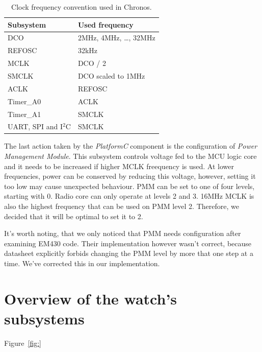 \begin{table}
  \centering
  \begin{tabular}{ | l | l | }
    \hline
    Subsystem & Used frequency \\
    \hline
    DCO & 2MHz, 4MHz, \ldots, 32MHz \\
    REFOSC & 32kHz \\
    MCLK & DCO / 2 \\
    SMCLK & DCO scaled to 1MHz  \\
    ACLK & REFOSC \\
    Timer\_A0 & ACLK \\
    Timer\_A1 & SMCLK \\
    UART, SPI and I$^2$C & SMCLK \\
    \hline
  \end{tabular}
  \caption{Clock frequency convention used in Chronos.}
  \label{fig:clock_speeds}
\end{table}

The last action taken by the \emph{PlatformC} component is the configuration of \emph{Power Management Module}. This subsystem controls voltage fed to the MCU logic core and it needs to be increased if higher MCLK freequency is used. At lower frequencies, power can be conserved by reducing this voltage, however, setting it too low may cause unexpected behaviour. PMM can be set to one of four levels, starting with 0. Radio core can only operate at levels 2 and 3. 16MHz MCLK is also the highest frequency that can be used on PMM level 2. Therefore, we decided that it will be optimal to set it to 2.

It's worth noting, that we only noticed that PMM needs configuration after examining EM430 code. Their implementation however wasn't correct, because datasheet explicitly forbids changing the PMM level by more that one step at a time. We've corrected this in our implementation.

\section{Overview of the watch's subsystems}

Figure~\ref{fig:}

